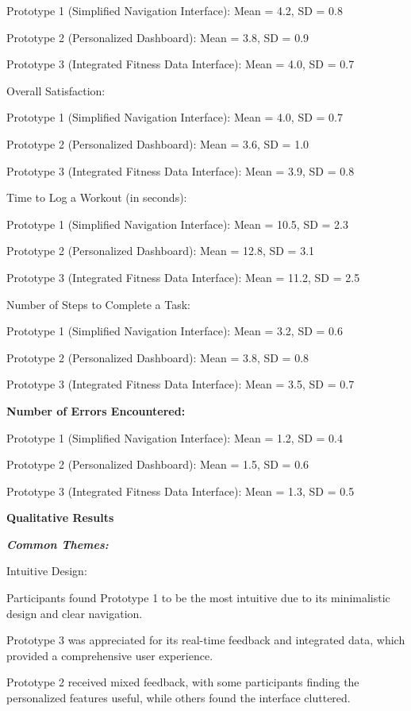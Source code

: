 \documentclass[
	letterpaper, %
]{jdf}
\begin{document}
Prototype 1 (Simplified Navigation Interface): Mean = 4.2, SD = 0.8

Prototype 2 (Personalized Dashboard): Mean = 3.8, SD = 0.9

Prototype 3 (Integrated Fitness Data Interface): Mean = 4.0, SD = 0.7

Overall Satisfaction:

 

Prototype 1 (Simplified Navigation Interface): Mean = 4.0, SD = 0.7

Prototype 2 (Personalized Dashboard): Mean = 3.6, SD = 1.0

Prototype 3 (Integrated Fitness Data Interface): Mean = 3.9, SD = 0.8

Time to Log a Workout (in seconds):

 

Prototype 1 (Simplified Navigation Interface): Mean = 10.5, SD = 2.3

Prototype 2 (Personalized Dashboard): Mean = 12.8, SD = 3.1

Prototype 3 (Integrated Fitness Data Interface): Mean = 11.2, SD = 2.5

Number of Steps to Complete a Task:

 

Prototype 1 (Simplified Navigation Interface): Mean = 3.2, SD = 0.6

Prototype 2 (Personalized Dashboard): Mean = 3.8, SD = 0.8

Prototype 3 (Integrated Fitness Data Interface): Mean = 3.5, SD = 0.7

\textbf{Number of Errors Encountered:
}
 

Prototype 1 (Simplified Navigation Interface): Mean = 1.2, SD = 0.4

Prototype 2 (Personalized Dashboard): Mean = 1.5, SD = 0.6

Prototype 3 (Integrated Fitness Data Interface): Mean = 1.3, SD = 0.5

\textbf{Qualitative Results}

\textbf{\textit{Common Themes:
}}
 

Intuitive Design:

Participants found Prototype 1 to be the most intuitive due to its minimalistic design and clear navigation.

Prototype 3 was appreciated for its real-time feedback and integrated data, which provided a comprehensive user experience.

Prototype 2 received mixed feedback, with some participants finding the personalized features useful, while others found the interface cluttered.
\end{document}
